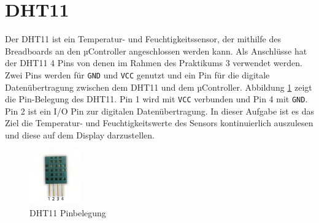 \section{\ExercisePrefixEmbeddedC DHT11 \optional}
Der DHT11 ist ein Temperatur- und Feuchtigkeitssensor, der mithilfe des Breadboards an den µController angeschlossen werden kann.
Als Anschlüsse hat der DHT11 4 Pins von denen im Rahmen des Praktikums  3 verwendet werden.
Zwei Pins werden für \lstinline|GND| und \lstinline|VCC| genutzt und ein Pin für die digitale Datenübertragung zwischen dem DHT11 und dem µController.
Abbildung \ref{fig:dht11Pins} zeigt die Pin-Belegung des DHT11.
Pin 1 wird mit \lstinline|VCC| verbunden und Pin 4 mit \lstinline|GND|. Pin 2 ist ein I/O Pin zur digitalen Datenübertragung.
In dieser Aufgabe ist es das Ziel die Temperatur- und Feuchtigkeitswerte des Sensors kontinuierlich auszulesen und diese auf dem Display darzustellen.
\begin{figure}[!htb]
	\centering
	\includegraphics[width=0.2\textwidth]{./05_c/figures/DHT11.png}
	\caption{DHT11 Pinbelegung}
	\label{fig:dht11Pins}
\end{figure} 

